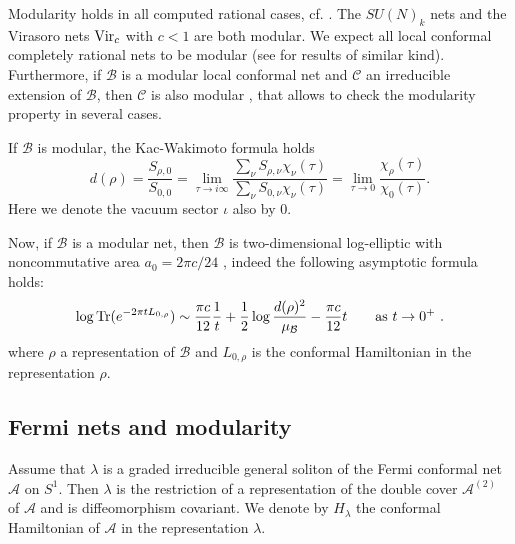 \documentclass[11pt]{article}
\DeclareMathOperator{\Tr}{Tr}
\def\l{\lambda}
\def\r{\rho}
\def\A{{\cal A}}
\def\B{{\cal B}}
\def\C{{\cal C}}
\def\A{{\mathcal A}}
\def\B{{\mathcal B}}
\def\C{{\mathcal C}}
\begin{document}
Modularity holds in all computed rational cases, cf. \cite{X3,X4}. 
The $SU(N)_k$ nets and the Virasoro nets ${\rm Vir}_c$ with $c<1$ are
both modular. We expect all local conformal completely rational 
nets to be modular (see \cite{Hu} for results of similar kind). 
Furthermore, if $\B
$ is a modular local conformal net and $\C
$ an irreducible extension of $\B
$, then $\C
$ is also modular \cite{KL05}, that allows to check 
the modularity property in several cases.

If $\B
$ is modular, the Kac-Wakimoto formula holds
%
\begin{equation}\label{KW1}
d(\r)=\frac{S_{\r,0}}{S_{0,0}}=
\lim_{\tau\to i\infty}\frac{\sum_\nu S_{\r,\nu}\chi_\nu(\tau)}
{\sum_\nu S_{0,\nu}\chi_\nu(\tau)}=
\lim_{\tau\to 0}\frac{\chi_\r(\tau)}{\chi_0(\tau)}.
\end{equation}
%
Here we denote the vacuum sector $\iota$ also by $0$.

Now, if $\B$ is a modular net, then $\B$ is two-dimensional 
log-elliptic with noncommutative area $a_0 = 2\pi c/24$ \cite{KL05}, 
indeed the following asymptotic formula holds:
\[
\log\Tr(e^{-2\pi tL_{0,\r}})\sim \frac{\pi c}{12}\frac1t + 
\frac{1}{2}\log\frac{d(\r)^2}{\mu_{\B
}}-
\frac{\pi c}{12}t\qquad {\rm as }\ t\to 0^+ \ .
\]
where $\r$ a representation of $\B$ and $L_{0,\r}$ is the conformal 
Hamiltonian in the representation $\r$.

%
\subsection{Fermi nets and modularity}
%
Assume that $\l$ is a graded irreducible general soliton of the Fermi conformal net $\A$ 
on $S^1$. Then $\l$ is the restriction of a representation of the double cover $\A^{(2)}$ of 
$\A$ and is diffeomorphism covariant. We denote by $H_{\l}$ the conformal Hamiltonian of 
$\A$ in the representation $\l$. 
\end{document}
